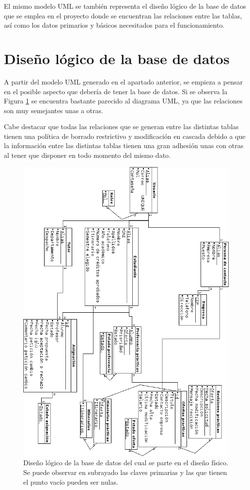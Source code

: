 \documentclass[pdftex,11pt,a4paper]{book}
\begin{document}
El mismo modelo UML se también representa el diseño lógico de la base de datos que se emplea en el proyecto donde se encuentran las relaciones entre las tablas, así como los datos primarios y básicos necesitados para el funcionamiento.

\section{Diseño lógico de la base de datos}

A partir del modelo UML generado en el apartado anterior, se empieza a pensar en el posible aspecto que debería de tener la base de datos. Si se observa la Figura \ref{logico} se encuentra bastante parecido al diagrama UML, ya que las relaciones son muy semejantes unas a otras.

Cabe destacar que todas las relaciones que se generan entre las distintas tablas tienen una política de borrado restrictivo y modificación en cascada debido a que la información entre las distintas tablas tienen una gran adhesión unas con otras al tener que disponer en todo momento del mismo dato.

\begin{figure}[]
\begin{center}
\includegraphics[width=\textwidth]{img/logico}
\caption{\label{logico} Diseño lógico de la base de datos del cual se parte en el diseño físico. Se puede observar en subrayado las claves primarias y las que tienen el punto vacío pueden ser nulas.}
\end{center}
\end{figure}
\end{document}
